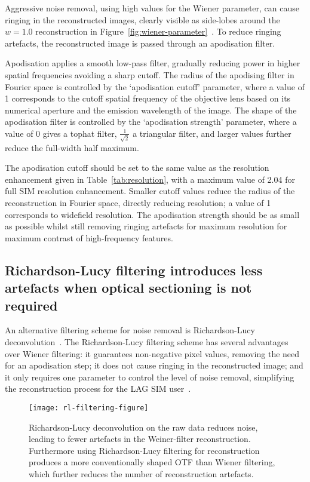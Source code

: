 Aggressive noise removal, using high values for the Wiener parameter, can cause ringing in the reconstructed images, clearly visible as side-lobes around the $w=1.0$ reconstruction in Figure~\ref{fig:wiener-parameter}~\cite{righolt2013image}. 
To reduce ringing artefacts, the reconstructed image is passed through an apodisation filter. 

Apodisation applies a smooth low-pass filter, gradually reducing power in higher spatial frequencies avoiding a sharp cutoff. 
The radius of the apodising filter in Fourier space is controlled by the `apodisation cutoff' parameter, where a value of 1 corresponds to the cutoff spatial frequency of the objective lens based on its numerical aperture and the emission wavelength of the image. 
The shape of the apodisation filter is controlled by the `apodisation strength' parameter, where a value of 0 gives a tophat filter, $\frac{1}{\sqrt{2}}$ a triangular filter, and larger values further reduce the full-width half maximum. 

The apodisation cutoff should be set to the same value as the resolution enhancement given in Table~\ref{tab:resolution}, with a maximum value of 2.04 for full SIM resolution enhancement. 
Smaller cutoff values reduce the radius of the reconstruction in Fourier space, directly reducing resolution; a value of 1 corresponds to widefield resolution. 
The apodisation strength should be as small as possible whilst still removing ringing artefacts for maximum resolution for maximum contrast of high-frequency features.  

\subsection{Richardson-Lucy filtering introduces less artefacts when optical sectioning is not required} \label{sec:RL-filter}
An alternative filtering scheme for noise removal is Richardson-Lucy deconvolution~\cite{perez2016optimal}. 
The Richardson-Lucy filtering scheme has several advantages over Wiener filtering: it guarantees non-negative pixel values, removing the need for an apodisation step; it does not cause ringing in the reconstructed image; and it only requires one parameter to control the level of noise removal, simplifying the reconstruction process for the LAG SIM user~\cite{eichstadt2013comparison, perez2016optimal}.

\begin{figure}[p]
\centering
\texttt{[image: rl-filtering-figure]}
\caption[LAG SIM: Richardson-Lucy filtering can further reduce SIM reconstruction artefacts]{Richardson-Lucy deconvolution on the raw data reduces noise, leading to fewer artefacts in the Weiner-filter reconstruction. Furthermore using Richardson-Lucy filtering for reconstruction produces a more conventionally shaped OTF than Wiener filtering, which further reduces the number of reconstruction artefacts.}
\label{fig:rl-filtering}
\end{figure}

